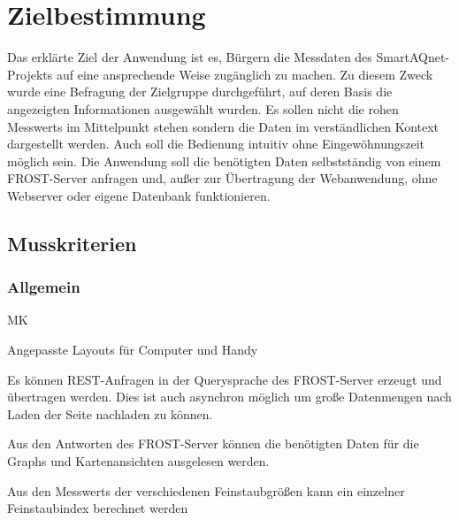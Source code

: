 \section{Zielbestimmung}
Das erklärte Ziel der Anwendung ist es, Bürgern die Messdaten des \gls{SmartAQnet}-Projekts auf eine ansprechende Weise zugänglich zu machen.
Zu diesem Zweck wurde eine Befragung der Zielgruppe durchgeführt, auf deren Basis die angezeigten Informationen ausgewählt wurden.
Es sollen nicht die rohen \glspl{Messwert} im Mittelpunkt stehen sondern die Daten im verständlichen Kontext dargestellt werden.
Auch soll die Bedienung intuitiv ohne Eingewöhnungszeit möglich sein.
Die Anwendung soll die benötigten Daten selbstständig von einem \gls{FROST-Server} anfragen und, außer zur Übertragung der \gls{Webanwendung}, ohne \gls{Webserver} oder eigene Datenbank funktionieren.

\subsection{Musskriterien}
\setcounter{counter}{10}

\subsubsection*{Allgemein}
\begin{Kriterien}{MK}

	\item Angepasste Layouts für Computer und \gls{Handy}
	
	\item Es können REST-Anfragen in der \gls{Querysprache} des \gls{FROST-Server} erzeugt und übertragen werden.
		Dies ist auch asynchron möglich um große Datenmengen nach Laden der Seite nachladen zu können.
	
	\item Aus den Antworten des \gls{FROST-Server} können die benötigten Daten für die \glspl{Graph} und Kartenansichten ausgelesen werden.
	
	\item Aus den \glspl{Messwert} der verschiedenen Feinstaubgrößen kann ein einzelner \gls{Feinstaubindex} berechnet werden
\end{Kriterien}

